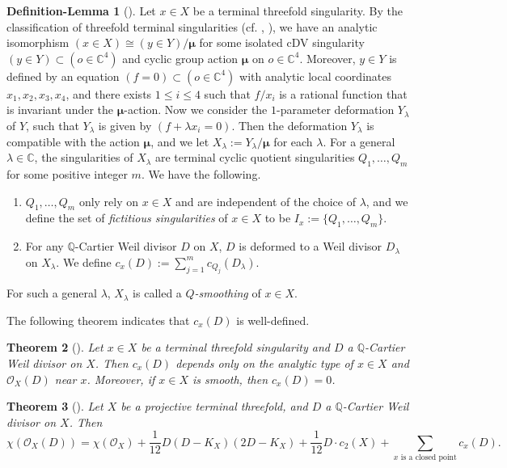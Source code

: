 \documentclass[11pt]{amsart}
\numberwithin{equation}{section}
\newcommand{\Qq}{\mathbb{Q}}
\newtheorem{thm}{Theorem}[section]
\theoremstyle{definition}
\newtheorem{deflem}[thm]{Definition-Lemma}
\theoremstyle{definition}
\begin{document}
\begin{deflem}[{\cite[(6.4)]{Rei87}}]\label{def: definition of general cP}
Let $x\in X$ be a terminal threefold singularity. By the classification of threefold terminal singularities (cf. \cite[(6.1) Theorem]{Rei87}, \cite[Theorems 12,23,25]{Mor85}), we have an analytic isomorphism $(x\in X)\cong (y\in Y)/\bm{\mu}$ for some isolated cDV singularity $(y\in Y)\subset(o\in\mathbb C^4)$ and cyclic group action $\bm{\mu}$ on $o\in\mathbb C^4$. Moreover, $y\in Y$ is defined by an equation $(f=0)\subset (o\in\mathbb C^4)$ with analytic local coordinates $x_1,x_2,x_3,x_4$, and there exists $1\leq i\leq 4$ such that $f/x_i$ is a rational function that is invariant under the $\bm\mu$-action. Now we consider the $1$-parameter deformation ${Y_\lambda}$ of $Y$, such that $Y_{\lambda}$ is given by $(f+\lambda x_i=0)$. Then the deformation ${Y_\lambda}$ is compatible with the action $\bm{\mu}$, and we let $X_{\lambda}:=Y_{\lambda}/\bm{\mu}$ for each $\lambda$. For a general $\lambda\in\mathbb C$, the singularities of $X_{\lambda}$ are terminal cyclic quotient singularities $Q_1,\dots,Q_m$ for some positive integer $m$. We have the following.
\begin{enumerate}
    \item $Q_1,\dots,Q_m$ only rely on $x\in X$ and are independent of the choice of $\lambda$, and we define the set of \emph{fictitious singularities} of $x\in X$ to be $I_x:=\{Q_1,\dots,Q_m\}$.
    \item For any $\Qq$-Cartier Weil divisor $D$ on $X$, $D$ is deformed to a Weil divisor $D_{\lambda}$ on $X_{\lambda}$. We define $c_x(D):=\sum_{j=1}^mc_{Q_j}(D_{\lambda})$.
\end{enumerate}
For such a general $\lambda$, $X_{\lambda}$ is called a \emph{$Q$-smoothing} of $x\in X$.

\end{deflem}

The following theorem indicates that $c_x(D)$ is well-defined.
 
 \begin{thm}[{\cite[Theorem~10.2(1)]{Rei87}}]\label{thm: cx(D) only analytic type}
 Let $x\in X$ be a terminal threefold singularity and $D$ a $\Qq$-Cartier Weil divisor on $X$. Then $c_x(D)$ depends only on the analytic type of $x\in X$ and $\mathcal{O}_X(D)$ near $x$. Moreover, if $x\in X$ is smooth, then $c_x(D)=0$.
\end{thm}


\begin{thm}[{\cite[Theorem~10.2]{Rei87}}]\label{thm: singular rr}
Let $X$ be a projective terminal threefold, and $D$ a $\Qq$-Cartier Weil divisor on $X$. Then $$\chi(\mathcal{O}_X(D))=\chi(\mathcal{O}_X)+\frac{1}{12}D(D-K_X)(2D-K_X)+\frac{1}{12}D\cdot c_2(X)+\sum_{x\text{ is a closed point}} c_x(D).$$ 
\end{thm}
\end{document}
